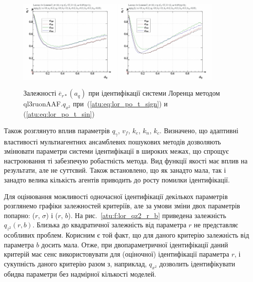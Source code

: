 \documentclass[a4paper,13pt]{atuaref}
\begin{document}
\begin{figure}[ht!]
  \centerline{
    \includegraphics[width=0.45\textwidth]{p5/p/cha/lor/ql3ruonAAF/lor_ql3ruonAAF_qx2-p_a_q_e_sign.png}
    \hfill
    \includegraphics[width=0.45\textwidth]{p5/p/cha/lor/ql3ruonAAF/lor_ql3ruonAAF_qx2-p_a_q_e_sin.png}
  }
  \caption{Залежності $\overline{e}_{r*}(a_q)$ при ідентифікації системи Лоренца методом ql3ruonAAF.$q_{x^2}$
   при~(\ref{atu:eq:lor_po_t_sign}) и (\ref{atu:eq:lor_po_t_sin})}
  \label{atu:f:lor_a_q_ql3ruonAAF.q_x2}
\end{figure}

Також розглянуто вплив параметрів $q_\gamma$, $v_f$, $k_e$, $k_n$, $k_c$.
Визначено, що адаптивні властивості мультиагентних ансамблевих пошукових методів дозволяють
змінювати параметри системи ідентифікації в широких межах,
що спрощує настроювання ті забезпечую робастність метода.
Вид функції якості має вплив на результати, але не суттєвий.
Також встановлено, що як занадто мала, так і занадто велика кількість агентів
приводить до росту помилки ідентифікації.

Для оцінювання можливості одночасної ідентифікації декількох параметрів
розглянемо графіки залежностей критеріїв, але за умови зміни двох параметрів
попарно: ($ r $, $\sigma $) і ($ r $, $ b $).
На рис.~\ref{atu:f:lor_qz2_r_b}
приведена залежність
$q_{z^2}(r,b)$.
Близька до квадратичної залежність від параметра $ r $ не представляє особливих
проблем. Корисним є той факт, що для даного критерію залежність від параметра $b $
досить мала. Отже, при двопараметричної ідентифікації даний критерій має
сенс використовувати для (оціночної) ідентифікації параметра $ r $, і
сукупність даного критерію разом з, наприклад, $ q_{x^2} $ дозволить
ідентифікувати обидва параметри без надмірної кількості моделей.
\end{document}

